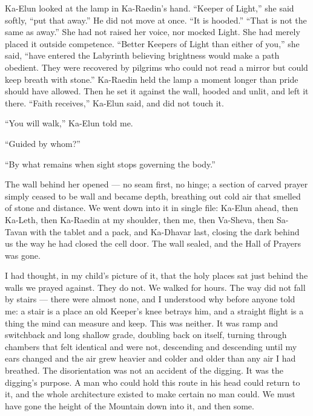 Ka-Elun looked at the lamp in Ka-Raedin's hand. ``Keeper of Light,'' she said softly, ``put that away.'' He did not move at once. ``It is hooded.'' ``That is not the same as away.'' She had not raised her voice, nor mocked Light. She had merely placed it outside competence. ``Better Keepers of Light than either of you,'' she said, ``have entered the Labyrinth believing brightness would make a path obedient. They were recovered by pilgrims who could not read a mirror but could keep breath with stone.'' Ka-Raedin held the lamp a moment longer than pride should have allowed. Then he set it against the wall, hooded and unlit, and left it there. ``Faith receives,'' Ka-Elun said, and did not touch it.\par
 
``You will walk,'' Ka-Elun told me.\par
 
``Guided by whom?''\par
 
``By what remains when sight stops governing the body.''\par
 
The wall behind her opened — no seam first, no hinge; a section of carved prayer simply ceased to be wall and became depth, breathing out cold air that smelled of stone and distance. We went down into it in single file: Ka-Elun ahead, then Ka-Leth, then Ka-Raedin at my shoulder, then me, then Va-Sheva, then Sa-Tavan with the tablet and a pack, and Ka-Dhavar last, closing the dark behind us the way he had closed the cell door. The wall sealed, and the Hall of Prayers was gone.\par
 
I had thought, in my child's picture of it, that the holy places sat just behind the walls we prayed against. They do not. We walked for hours. The way did not fall by stairs — there were almost none, and I understood why before anyone told me: a stair is a place an old Keeper's knee betrays him, and a straight flight is a thing the mind can measure and keep. This was neither. It was ramp and switchback and long shallow grade, doubling back on itself, turning through chambers that felt identical and were not, descending and descending until my ears changed and the air grew heavier and colder and older than any air I had breathed. The disorientation was not an accident of the digging. It was the digging's purpose. A man who could hold this route in his head could return to it, and the whole architecture existed to make certain no man could. We must have gone the height of the Mountain down into it, and then some.\par
 
